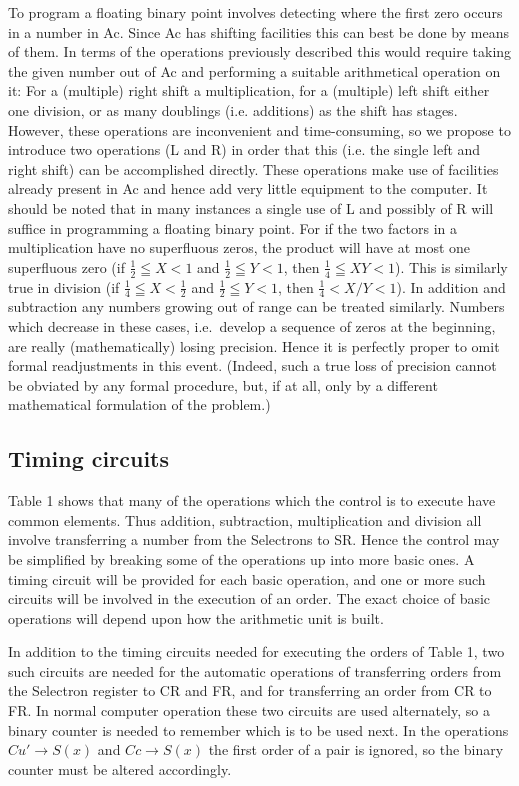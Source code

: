 \documentclass[12pt]{amsart}
\begin{document}
To program a floating binary point involves detecting where the first zero occurs in a number in Ac. Since Ac has shifting facilities this can best be done by means of them. In terms of the operations previously described this would require taking the given number out of Ac and performing a suitable arithmetical operation on it: For a (multiple) right shift a multiplication, for a (multiple) left shift either one division, or as many doublings (i.e. additions) as the shift has stages. However, these operations are inconvenient and time-consuming, so we propose to introduce two operations (L and R) in order that this (i.e. the single left and right shift) can be accomplished directly. These operations make use of facilities already present in Ac and hence add very little equipment to the computer. It should be noted that in many instances a single use of L and possibly of R will suffice in programming a floating binary point. For if the two factors in a multiplication have no superfluous zeros, the product will have at most one superfluous zero (if $\frac{1}{2} \leqq X < 1$ and $\frac{1}{2} \leqq Y < 1$, then $\frac{1}{4} \leqq XY < 1$). This is similarly true in division (if $\frac{1}{4} \leqq X < \frac{1}{2}$ and $\frac{1}{2} \leqq Y < 1$, then $\frac{1}{4} < X/Y < 1$). In addition and subtraction any numbers growing out of range can be treated similarly. Numbers which decrease in these cases, i.e.\ develop a sequence of zeros at the beginning, are really (mathematically) losing precision. Hence it is perfectly proper to omit formal readjustments in this event. (Indeed, such a true loss of precision cannot be obviated by any formal procedure, but, if at all, only by a different mathematical formulation of the problem.)

\subsection{Timing circuits}
Table 1 shows that many of the operations which the control is to execute have common elements. Thus addition, subtraction, multiplication and division all involve transferring a number from the Selectrons to SR. Hence the control may be simplified by breaking some of the operations up into more basic ones. A timing circuit will be provided for each basic operation, and one or more such circuits will be involved in the execution of an order. The exact choice of basic operations will depend upon how the arithmetic unit is built.

In addition to the timing circuits needed for executing the orders of Table 1, two such circuits are needed for the automatic operations of transferring orders from the Selectron register to CR and FR, and for transferring an order from CR to FR. In normal computer operation these two circuits are used alternately, so a binary counter is needed to remember which is to be used next. In the operations $Cu' \rightarrow S(x)$ and $Cc \rightarrow S(x)$ the first order of a pair is ignored, so the binary counter must be altered accordingly.
\end{document}
